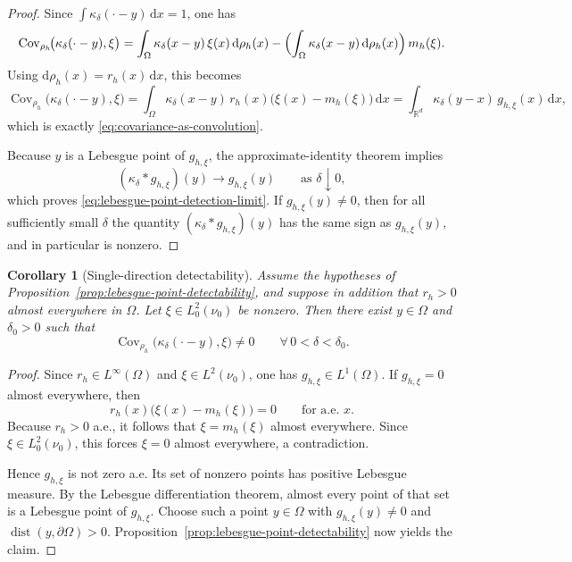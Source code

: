\documentclass{article}
\newtheorem{corollary}[theorem]{Corollary}
\theoremstyle{definition}
\DeclareMathOperator{\dist}{dist}
\renewcommand{\d}{\mathrm{d}}
\begin{document}
\begin{proof}
    Since \(\int \kappa_\delta(\cdot-y)\,\d x=1\), one has
    \[
        \operatorname{Cov}_{\rho_h}\!\bigl(\kappa_\delta(\cdot-y),\xi\bigr)
        =
        \int_\Omega \kappa_\delta(x-y)\,\xi(x)\,\d\rho_h(x)
        -
        \Bigl(\int_\Omega \kappa_\delta(x-y)\,\d\rho_h(x)\Bigr)\,m_h(\xi).
    \]
    Using \(\d\rho_h(x)=r_h(x)\,\d x\), this becomes
    \[
        \operatorname{Cov}_{\rho_h}\!\bigl(\kappa_\delta(\cdot-y),\xi\bigr)
        =
        \int_\Omega \kappa_\delta(x-y)\,r_h(x)\bigl(\xi(x)-m_h(\xi)\bigr)\,\d x
        =
        \int_{\mathbb R^d}\kappa_\delta(y-x)\,g_{h,\xi}(x)\,\d x,
    \]
    which is exactly \eqref{eq:covariance-as-convolution}.

    Because \(y\) is a Lebesgue point of \(g_{h,\xi}\), the approximate-identity theorem implies
    \[
        (\kappa_\delta*g_{h,\xi})(y)\longrightarrow g_{h,\xi}(y)
        \qquad\text{as }\delta\downarrow 0,
    \]
    which proves \eqref{eq:lebesgue-point-detection-limit}. If \(g_{h,\xi}(y)\neq 0\), then for all
    sufficiently small \(\delta\) the quantity \((\kappa_\delta*g_{h,\xi})(y)\) has the same sign as
    \(g_{h,\xi}(y)\), and in particular is nonzero.
\end{proof}

\begin{corollary}[Single-direction detectability]
    \label{cor:arbitrary-direction-detectability}
    Assume the hypotheses of Proposition~\ref{prop:lebesgue-point-detectability}, and suppose in
    addition that \(r_h>0\) almost everywhere in \(\Omega\). Let \(\xi\in L^2_0(\nu_0)\) be nonzero.
    Then there exist \(y\in\Omega\) and \(\delta_0>0\) such that
    \[
        \operatorname{Cov}_{\rho_h}\!\bigl(\kappa_\delta(\cdot-y),\xi\bigr)\neq 0
        \qquad
        \forall\,0<\delta<\delta_0.
    \]
\end{corollary}

\begin{proof}
    Since \(r_h\in L^\infty(\Omega)\) and \(\xi\in L^2(\nu_0)\), one has \(g_{h,\xi}\in L^1(\Omega)\).
    If \(g_{h,\xi}=0\) almost everywhere, then
    \[
        r_h(x)\bigl(\xi(x)-m_h(\xi)\bigr)=0
        \qquad\text{for a.e. }x.
    \]
    Because \(r_h>0\) a.e., it follows that \(\xi=m_h(\xi)\) almost everywhere. Since
    \(\xi\in L^2_0(\nu_0)\), this forces \(\xi=0\) almost everywhere, a contradiction.

    Hence \(g_{h,\xi}\) is not zero a.e. Its set of nonzero points has positive Lebesgue measure.
    By the Lebesgue differentiation theorem, almost every point of that set is a Lebesgue point of
    \(g_{h,\xi}\). Choose such a point \(y\in\Omega\) with \(g_{h,\xi}(y)\neq 0\) and
    \(\dist(y,\partial\Omega)>0\). Proposition~\ref{prop:lebesgue-point-detectability} now yields the
    claim.
\end{proof}
\end{document}
